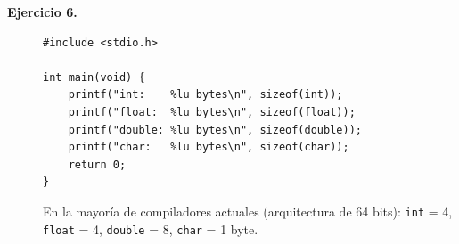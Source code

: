\documentclass[11pt,letterpaper]{article}
\theoremstyle{definition}
\begin{document}
\begin{description}
\item[\textbf{Ejercicio 6.}]
\begin{lstlisting}
#include <stdio.h>

int main(void) {
    printf("int:    %lu bytes\n", sizeof(int));
    printf("float:  %lu bytes\n", sizeof(float));
    printf("double: %lu bytes\n", sizeof(double));
    printf("char:   %lu bytes\n", sizeof(char));
    return 0;
}
\end{lstlisting}
En la mayoría de compiladores actuales (arquitectura de 64 bits): \texttt{int} = 4,
\texttt{float} = 4, \texttt{double} = 8, \texttt{char} = 1 byte.

\end{description}
\end{document}
